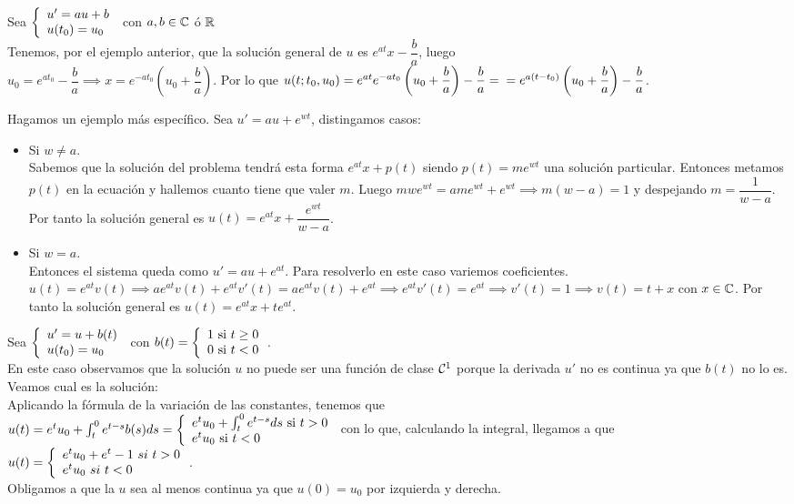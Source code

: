 \begin{ejem} Sea $\left\{\begin{array}{ll} u'=au+b \\ u(t_0)=u_0 \\ \end{array} \right.$ con $a,b\in \mathbb{C}$ ó $\mathbb{R}$\\
Tenemos, por el ejemplo anterior, que la solución general de $u$ es $e^{at}x-\dfrac{b}{a}$, luego\\
$u_0=e^{at_0}-\dfrac{b}{a}\implies x = e^{-at_0}\left(u_0+\dfrac{b}{a}\right)$. Por lo que $u(t;t_0,u_0)=e^{at}e^{-at_0}\left(u_0+\dfrac{b}{a}\right)-\dfrac{b}{a}=\\=e^{a(t-t_0)}\left(u_0+\dfrac{b}{a}\right)-\dfrac{b}{a}$.
\end{ejem}

\begin{ejem}
Hagamos un ejemplo más específico. Sea  $u'=au+e^{wt}$, distingamos casos:
\begin{itemize}
\item Si $w\neq a$.\\
Sabemos que la solución del problema tendrá esta forma $e^{at}x + p(t)$ siendo $p(t)=me^{wt}$ una solución particular. Entonces metamos $p(t)$ en la ecuación y hallemos cuanto tiene que valer $m$. Luego $mwe^{wt}= ame^{wt} + e^{wt} \implies m(w-a)=1$ y despejando  $m=\dfrac{1}{w-a}$. 
Por tanto la solución general es $u(t)= e^{at}x + \dfrac{e^{wt}}{w-a}$.
\item Si $w=a$.\\
Entonces el sistema queda como $u'=au +e^{at}$. Para resolverlo en este caso variemos coeficientes. 
$u(t)=e^{at}v(t) \implies ae^{at}v(t) + e^{at}v'(t)= ae^{at}v(t)+e^{at} \implies e^{at}v'(t)=e^{at} \implies v'(t)=1 \implies v(t)=t + x$ con $x \in \mathbb{C}$. Por tanto la solución general es $u(t)=e^{at}x +te^{at}$. 
\end{itemize}
\end{ejem}

\begin{ejem} Sea $\left\{\begin{array}{ll} u'=u+b(t) \\ u(t_0)=u_0 \\ \end{array} \right.$ con $b(t)=\doubleleft{1\ \mathrm{si}\ t\geq0}{0\ \mathrm{si}\ t<0}$.\\
En este caso observamos que la solución $u$ no puede ser una función de clase $\mathcal{C}^1$ porque la derivada $u'$ no es continua ya que $b(t)$ no lo es. Veamos cual es la solución:\\
Aplicando la fórmula de la variación de las constantes, tenemos que \\ $u(t)= e^{t}u_0 + \inte{0}{t}e^{t-s}b(s)ds = \doubleleft{e^{t}u_0 + \inte{0}{t}e^{t-s}ds \ \mathrm{si}\ t>0}{e^{t}u_0 \ \mathrm{si}\ t<0}$ con lo que, calculando la integral, llegamos a que $u(t)=\doubleleft{e^{t}u_0 + e^{t}-1 \ si\ t>0}{e^{t}u_0 \ si\ t<0}$.\\
Obligamos a que la $u$ sea al menos continua ya que $u(0)=u_0$ por izquierda y derecha.
\end{ejem}

